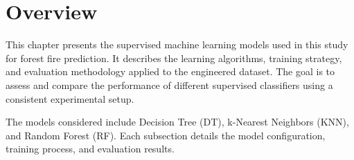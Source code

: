 \section{Overview}

This chapter presents the supervised machine learning models used in this study for forest fire prediction. It describes the learning algorithms, training strategy, and evaluation methodology applied to the engineered dataset. The goal is to assess and compare the performance of different supervised classifiers using a consistent experimental setup.

The models considered include Decision Tree (DT), k-Nearest Neighbors (KNN), and Random Forest (RF). Each subsection details the model configuration, training process, and evaluation results.




